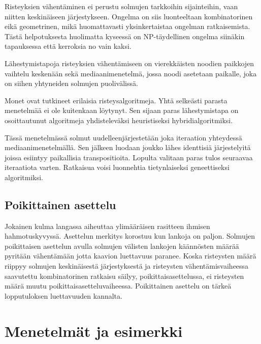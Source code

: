 \documentclass[finnish,12pt]{article}
\begin{document}
Risteyksien vähentäminen ei perustu solmujen tarkkoihin sijainteihin, vaan
niitten keskinäiseen järjestykseen. Ongelma on siis luonteeltaan kombinatorinen
eikä geometrinen, mikä huomattavasti yksinkertaistaa ongelman ratkaisemista.
Tästä helpotuksesta huolimatta kyseessä on NP-täydellinen ongelma siinäkin
tapauksessa että kerroksia no vain kaksi. \cite{RefWorks:40}

Lähestymistapoja risteyksien vähentämiseen on vierekkäisten noodien paikkojen
vaihtelu keskenään sekä mediaanimenetelmä, jossa noodi asetetaan paikalle, joka
on siihen yhtyneiden solmujen puolivälissä.

Monet ovat tutkineet erilaisia risteysalgoritmeja.
Yhtä selkeästi parasta menetelmää ei ole kuitenkaan löytynyt.
Sen sijaan paras lähestymistapa on osoittautunut algoritmeja
yhdisteleväksi heuristiseksi hybridialgoritmiksi.

Tässä menetelmässä solmut uudelleenjärjestetään joka iteraation yhteydessä mediaanimenetelmällä.
Sen jälkeen luodaan joukko lähes identtisiä järjestelyitä joissa esiintyy paikallisia transpositioita.
Lopulta valitaan paras tulos seuraavaa iteraatiota varten.
Ratkaisua voisi luonnehtia tietynlaiseksi geneettiseksi algoritmiksi.


		\subsection{Poikittainen asettelu}

Jokainen kulma langassa aiheuttaa ylimääräisen rasitteen ihmisen hahmotuskyvyssä. \cite{RefWorks:47}
Asettelun merkitys korostuu kun lankoja on paljon.	
Solmujen poikittaisen asettelun avulla solmujen välisten lankojen käännösten
määrää pyritään vähentämään jotta kaavion luettavuus paranee.
Koska risteysten määrä riippyy solmujen keskinäisestä järjestyksestä ja
risteysten vähentämisvaiheessa saavutettu kombinatorinen ratkaisu säilyy, poikittaisasettelussa,
ei risteysten määrä muutu poikittaisasetteluvaiheessa.
Poikittainen asettelu on tärkeä lopputuloksen luettavuuden kannalta.

	\clearpage
	\section{Menetelmät ja esimerkki}
\end{document}
